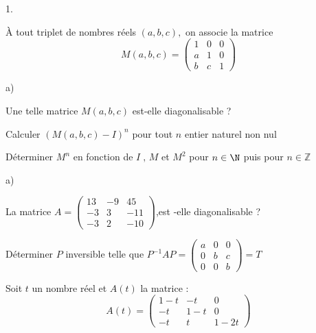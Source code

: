 \documentclass[11pt]{article}%
\begin{document}
\begin{noliste}{1.}
\item À tout triplet de nombres réels $\left( a,b,c\right) ,$ on
  associe la matrice
  \[
  M\left( a,b,c\right) =\left( 
    \begin{array}{rrr}
      1 & 0 & 0 \\ 
      a & 1 & 0 \\ 
      b & c & 1%
    \end{array}%
  \right) 
  \]

  \begin{noliste}{a)}
  \item Une telle matrice $M\left( a,b,c\right) $ est-elle diagonalisable ?

  \item Calculer $\left( M\left( a,b,c\right) -I\right) ^{n}$ pour tout $n$
    entier naturel non nul

  \item Déterminer $M^{n}$ en fonction de $I\;,\,M$ et $M^{2}$ pour $n\in 
    \N$ puis pour $n\in \mathbb{Z}$
  \end{noliste}

\item 
  \begin{noliste}{a)}
  \item La matrice $A=\left( 
      \begin{array}{rrr}
        13 & -9 & 45 \\ 
        -3 & 3 & -11 \\ 
        -3 & 2 & -10%
      \end{array}%
    \right) $,est -elle diagonalisable ?

  \item Déterminer $P$ inversible telle que $P^{-1}AP=\left( 
      \begin{array}{rrr}
        a & 0 & 0 \\ 
        0 & b & c \\ 
        0 & 0 & b%
      \end{array}%
    \right) =T$
  \end{noliste}

\item Soit $t$ un nombre réel et $A\left( t\right) $ la matrice : 
  \[
  A\left( t\right) =\left( 
    \begin{array}{ccc}
      1-t & -t & 0 \\ 
      -t & 1-t & 0 \\ 
      -t & t & 1-2t%
    \end{array}%
  \right) 
  \]


\end{noliste}
\end{document}
